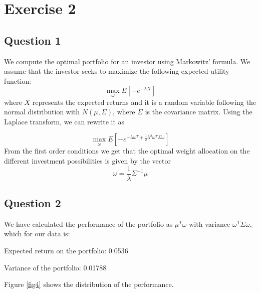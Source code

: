 \chapter{Exercise 2}

\section{Question 1}
We compute the optimal portfolio for an investor using Markowitz' formula. We assume that the investor seeks to maximize the following expected utility function:
\begin{equation*}
\max_\omega E\left[-e^{-\lambda X}\right]
\end{equation*}
where $X$ represents the expected returns and it is a random variable following the normal distribution with $N(\mu, \Sigma)$, where $\Sigma$ is the covariance matrix. Using the Laplace transform, we can rewrite it as

\begin{equation*}
\max_\omega E\left[-e^{{-\lambda \omega^T+}\frac{1}{2}\lambda^2\omega^T\Sigma\omega}\right]
\end{equation*}
From the first order conditions we get that the optimal weight allocation on the different investment possibilities is given by the vector
\begin{equation*}
\omega = \frac{1}{\lambda}\Sigma^{-1}\mu
\end{equation*}

\section{Question 2}

We have calculated the performance of the portfolio as $\mu^T\omega$ with variance $\omega^T\Sigma\omega$, which for our data is: \bigskip

Expected return on the portfolio: 0.0536

Variance of the portfolio: 0.01788 \bigskip

Figure \ref{fig4} shows the distribution of the performance.

